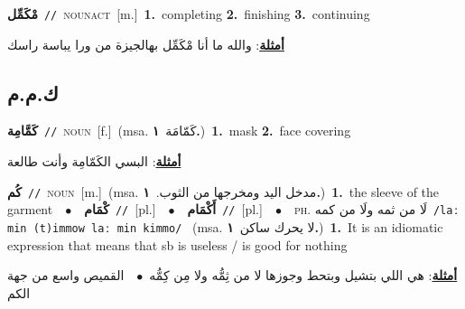 \documentclass[10pt,a4paper,twoside]{article} %
\begin{document}
\begin{multicols}{2}
{\setlength\topsep{0pt}\textbf{\foreignlanguage{arabic}{مْكَمِّل}}\ {\color{gray}\texttt{//}\color{black}}\ \textsc{noun\textunderscore act}\ [m.]\ \textbf{1.}~completing  \textbf{2.}~finishing  \textbf{3.}~continuing\  \begin{flushright}\color{gray}\foreignlanguage{arabic}{\textbf{\underline{\foreignlanguage{arabic}{أمثلة}}}: والله ما أنا مْكَمِّل بهالجيزة من ورا يباسة راسك}\end{flushright}\color{black}} \vspace{2mm}

\vspace{-3mm}
\subsection*{\color{blue}\foreignlanguage{arabic}{ك.م.م}\color{blue}{}} 

{\setlength\topsep{0pt}\textbf{\foreignlanguage{arabic}{كَمَّامِة}}\ {\color{gray}\texttt{//}\color{black}}\ \textsc{noun}\ [f.]\ \color{gray}(msa. \foreignlanguage{arabic}{كَمّامَة}~\foreignlanguage{arabic}{\textbf{١.}})\color{black}\ \textbf{1.}~mask  \textbf{2.}~face covering\  \begin{flushright}\color{gray}\foreignlanguage{arabic}{\textbf{\underline{\foreignlanguage{arabic}{أمثلة}}}: البسي الكَمّامِة وأنت طالعة}\end{flushright}\color{black}} \vspace{2mm}

{\setlength\topsep{0pt}\textbf{\foreignlanguage{arabic}{كُم}}\ {\color{gray}\texttt{//}\color{black}}\ \textsc{noun}\ [m.]\ \color{gray}(msa. \foreignlanguage{arabic}{مدخل اليد ومخرجها من الثوب.}~\foreignlanguage{arabic}{\textbf{١.}})\color{black}\ \textbf{1.}~the sleeve of the garment\ \ $\bullet$\ \ \setlength\topsep{0pt}\textbf{\foreignlanguage{arabic}{كْمَام}}\ {\color{gray}\texttt{//}\color{black}}\ [pl.]\ \ $\bullet$\ \ \setlength\topsep{0pt}\textbf{\foreignlanguage{arabic}{أَكْمَام}}\ {\color{gray}\texttt{//}\color{black}}\ [pl.]\ \ $\bullet$\ \ \textsc{ph.} \color{gray} \foreignlanguage{arabic}{لَا من ثمه ولَا من كمه}\color{black}\ {\color{gray}\texttt{/{\sffamily laː min (t)immow laː min kimmo}/}\color{black}}\ \color{gray} (msa. \foreignlanguage{arabic}{لا يحرك ساكن}~\foreignlanguage{arabic}{\textbf{١.}})\color{black}\ \textbf{1.}~It is an idiomatic expression that means that sb is useless / is good for nothing\  \begin{flushright}\color{gray}\foreignlanguage{arabic}{\textbf{\underline{\foreignlanguage{arabic}{أمثلة}}}: هي اللي بتشيل وبتحط وجوزها لا من ثِمُّه ولا مِن كِمُّه\ $\bullet$\ \  القميص واسع من جهة الكم}\end{flushright}\color{black}} \vspace{2mm}


\end{multicols}
\end{document}
